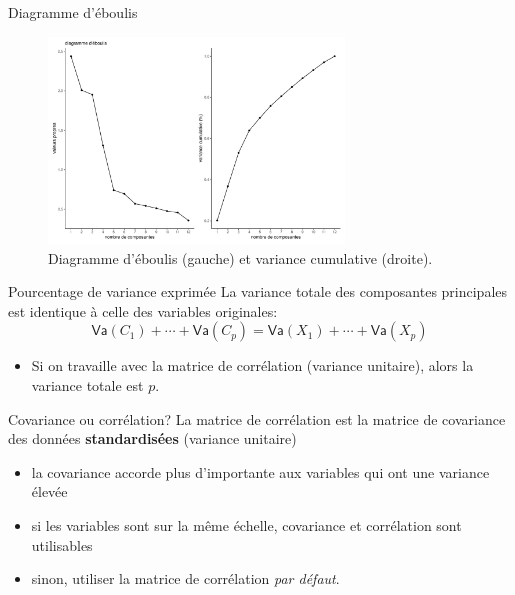 \documentclass[
  ignorenonframetext,
]{beamer}
\providecommand{\tightlist}{%
  \setlength{\itemsep}{0pt}\setlength{\parskip}{0pt}}\usepackage{longtable,booktabs,array}
\begin{document}
\begin{frame}{Diagramme d'éboulis}
\protect\hypertarget{diagramme-duxe9boulis}{}
\begin{figure}

{\centering \includegraphics[width=0.7\textwidth,height=\textheight]{MATH60602-diapos10_files/figure-beamer/fig-screeplot-1.pdf}

}

\caption{\label{fig-screeplot}Diagramme d'éboulis (gauche) et variance
cumulative (droite).}

\end{figure}
\end{frame}

\begin{frame}{Pourcentage de variance exprimée}
\protect\hypertarget{pourcentage-de-variance-exprimuxe9e}{}
La variance totale des composantes principales est identique à celle des
variables originales:
\[ \mathsf{Va}(C_1) + \cdots + \mathsf{Va}(C_p) = \mathsf{Va}(X_1) + \cdots + \mathsf{Va}(X_p)\]

\begin{itemize}
\tightlist
\item
  Si on travaille avec la matrice de corrélation (variance unitaire),
  alors la variance totale est \(p\).
\end{itemize}
\end{frame}

\begin{frame}{Covariance ou corrélation?}
\protect\hypertarget{covariance-ou-corruxe9lation}{}
La matrice de corrélation est la matrice de covariance des données
\textbf{standardisées} (variance unitaire)

\begin{itemize}
\tightlist
\item
  la covariance accorde plus d'importante aux variables qui ont une
  variance élevée
\item
  si les variables sont sur la même échelle, covariance et corrélation
  sont utilisables
\item
  sinon, utiliser la matrice de corrélation \emph{par défaut}.
\end{itemize}
\end{frame}
\end{document}

